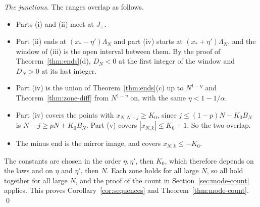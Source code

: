 \emph{The junctions.} The ranges overlap as follows.
\begin{itemize}[nosep]
\item Parts (i) and (ii) meet at $J_\plus$.
\item Part (ii) ends at $(x_*-\eta')\Lambda_N$ and part (iv) starts at $(x_*+\eta')\Lambda_N$, and the
window of (iii) is the open interval between them. By the proof of Theorem~\ref{thm:ends}(d),
$D_N<0$ at the first integer of the window and $D_N>0$ at its last integer.
\item Part (iv) is the union of Theorem~\ref{thm:ends}(c) up to $N^{1-\eta}$ and
Theorem~\ref{thm:zone-diff} from $N^{1-\eta}$ on, with the same $\eta<1-1/\alpha$.
\item Part (iv) covers the points with $x_{N,N-j}\ge K_0$, since $j\le(1-p)N-K_0B_N$ is
$N-j\ge pN+K_0B_N$. Part (v) covers $|x_{N,k}|\le K_0+1$. So the two overlap.
\item The minus end is the mirror image, and covers $x_{N,k}\le-K_0$.
\end{itemize}
The constants are chosen in the order $\eta,\eta'$, then $K_0$, which therefore depends on the
laws and on $\eta$ and $\eta'$, then $N$. Each zone holds for
all large $N$, so all hold together for all large $N$, and the proof of the count in
Section~\ref{sec:mode-count} applies. This proves Corollary~\ref{cor:sequences} and
Theorem~\ref{thm:mode-count}. \qed
